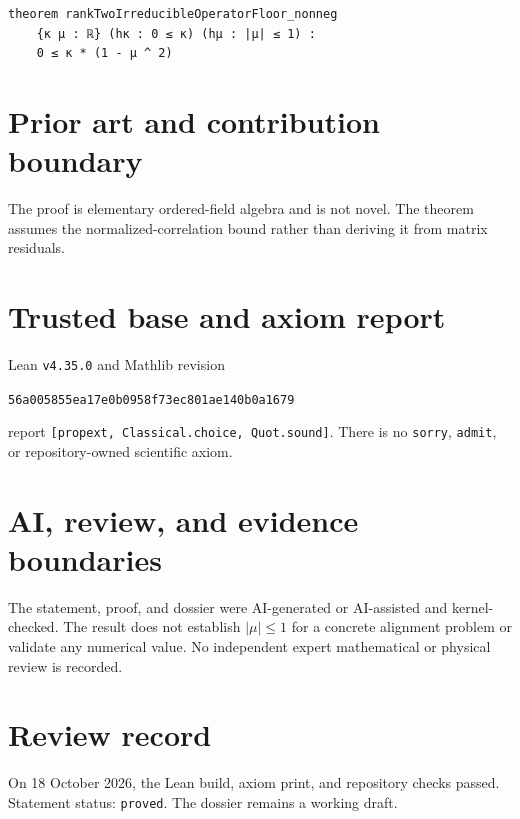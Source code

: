 \documentclass[11pt]{article}
\begin{document}
\begin{lstlisting}
theorem rankTwoIrreducibleOperatorFloor_nonneg
    {κ μ : ℝ} (hκ : 0 ≤ κ) (hμ : |μ| ≤ 1) :
    0 ≤ κ * (1 - μ ^ 2)
\end{lstlisting}

\section{Prior art and contribution boundary}
The proof is elementary ordered-field algebra and is not novel. The theorem assumes the
normalized-correlation bound rather than deriving it from matrix residuals.

\section{Trusted base and axiom report}
Lean \texttt{v4.35.0} and Mathlib revision
\begin{center}\texttt{56a005855ea17e0b0958f73ec801ae140b0a1679}\end{center}
report \texttt{[propext, Classical.choice, Quot.sound]}. There is no \texttt{sorry},
\texttt{admit}, or repository-owned scientific axiom.

\section{AI, review, and evidence boundaries}
The statement, proof, and dossier were AI-generated or AI-assisted and kernel-checked.
The result does not establish $|\mu|\le1$ for a concrete alignment problem or validate
any numerical value. No independent expert mathematical or physical review is recorded.

\section{Review record}
On 18 October 2026, the Lean build, axiom print, and repository checks passed. Statement
status: \texttt{proved}. The dossier remains a working draft.
\end{document}
